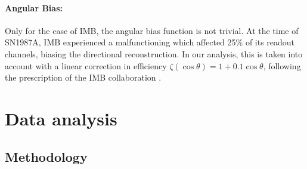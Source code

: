\documentclass[a4paper,11pt]{article}
\begin{document}
\paragraph*{Angular Bias:}
Only for the case of IMB, the angular bias function is not trivial. At the time of SN1987A, IMB experienced a malfunctioning which affected 25\% of its readout channels, biasing the directional reconstruction. In our analysis, this is taken into account with a linear correction in efficiency $\zeta(\cos\theta)=1+0.1\cos \theta$, following the prescription of the IMB collaboration \cite{IMB:1988suc}.










\section{Data analysis} 

\subsection{Methodology} 
\end{document}
